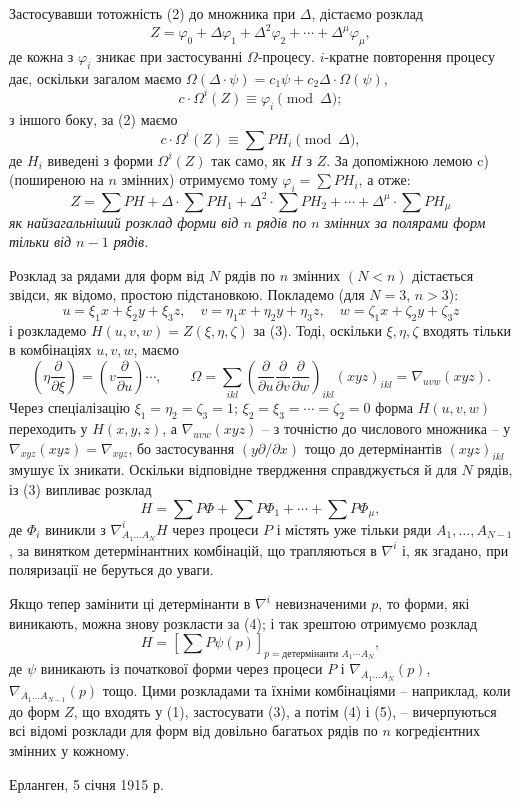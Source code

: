 \documentclass[11pt]{article}
\begin{document}
Застосувавши тотожність (2) до множника при $\Delta$, дістаємо розклад
\[
  Z=\varphi_0+\Delta\varphi_1+\Delta^2\varphi_2+\cdots+\Delta^\mu\varphi_\mu,
\]
де кожна з $\varphi_i$ зникає при застосуванні $\Omega$-процесу. $i$-кратне повторення процесу дає, оскільки загалом маємо $\Omega(\Delta\cdot\psi)=c_1\psi+c_2\Delta\cdot\Omega(\psi)$,
\[
  c\cdot \Omega^i(Z)\equiv\varphi_i\pmod{\Delta};
\]
з іншого боку, за (2) маємо
\[
  c\cdot\Omega^i(Z)\equiv\sum PH_i\pmod{\Delta},
\]
де $H_i$ виведені з форми $\Omega^i(Z)$ так само, як $H$ з $Z$. За допоміжною лемою c) (поширеною на $n$ змінних) отримуємо тому $\varphi_i=\sum PH_i$, а отже:
\begin{equation}
  Z=\sum PH+\Delta\cdot\sum PH_1+\Delta^2\cdot\sum PH_2+
  \cdots+\Delta^\mu\cdot\sum PH_\mu
\tag{3}
\end{equation}
\emph{як найзагальніший розклад форми від $n$ рядів по $n$ змінних за полярами форм тільки від $n-1$ рядів.}

Розклад за рядами для форм від $N$ рядів по $n$ змінних $(N<n)$ дістається звідси, як відомо, простою підстановкою. Покладемо (для $N=3$, $n>3$):
\[
  u=\xi_1x+\xi_2y+\xi_3z,
  \quad v=\eta_1x+\eta_2y+\eta_3z,
  \quad w=\zeta_1x+\zeta_2y+\zeta_3z
\]
і розкладемо $H(u,v,w)=Z(\xi,\eta,\zeta)$ за (3). Тоді, оскільки $\xi,\eta,\zeta$ входять тільки в комбінаціях $u,v,w$, маємо
\[
  \left(\eta\frac{\partial}{\partial \xi}\right)=
  \left(v\frac{\partial}{\partial u}\right)\cdots,
  \qquad
  \Omega=\sum_{ikl}\left(\frac{\partial}{\partial u}
  \frac{\partial}{\partial v}
  \frac{\partial}{\partial w}\right)_{ikl}(xyz)_{ikl}
  =\nabla_{uvw}(xyz).
\]
Через спеціалізацію $\xi_1=\eta_2=\zeta_3=1$; $\xi_2=\xi_3=\cdots=\zeta_2=0$ форма $H(u,v,w)$ переходить у $H(x,y,z)$, а $\nabla_{uvw}(xyz)$ -- з точністю до числового множника -- у $\nabla_{xyz}(xyz)=\nabla_{xyz}$, бо застосування $(y\partial/\partial x)$ тощо до детермінантів $(xyz)_{ikl}$ змушує їх зникати. Оскільки відповідне твердження справджується й для $N$ рядів, із (3) випливає розклад
\begin{equation}
  H=\sum P\Phi+\sum P\Phi_1+\cdots+\sum P\Phi_\mu,
\tag{4}
\end{equation}
де $\Phi_i$ виникли з $\nabla^i_{A_1\ldots A_N}H$ через процеси $P$ і містять уже тільки ряди $A_1,\ldots,A_{N-1}$, за винятком детермінантних комбінацій, що трапляються в $\nabla^i$ і, як згадано, при поляризації не беруться до уваги.

Якщо тепер замінити ці детермінанти в $\nabla^i$ невизначеними $p$, то форми, які виникають, можна знову розкласти за (4); і так зрештою отримуємо розклад
\begin{equation}
  H=\left[\sum P\psi(p)\right]_{p=\text{детермінанти }A_1\cdots A_N},
\tag{5}
\end{equation}
де $\psi$ виникають із початкової форми через процеси $P$ і $\nabla_{A_1\ldots A_N}(p)$, $\nabla_{A_1\ldots A_{N-1}}(p)$ тощо. Цими розкладами та їхніми комбінаціями -- наприклад, коли до форм $Z$, що входять у (1), застосувати (3), а потім (4) і (5), -- вичерпуються всі відомі розклади для форм від довільно багатьох рядів по $n$ когредієнтних змінних у кожному.

Ерланген, 5 січня 1915 р.
\end{document}
